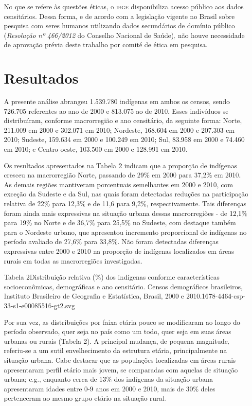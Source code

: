 \documentclass{article}
\begin{document}
No que se refere às questões éticas, o \textsc{ibge} disponibiliza acesso público aos
dados censitários. Dessa forma, e de acordo com a legislação vigente no Brasil
sobre pesquisa com seres humanos utilizando dados secundários de domínio público
(\textit{Resolução nº 466/2012}
do Conselho Nacional de Saúde), não houve necessidade de aprovação prévia deste
trabalho por comité de ética em pesquisa.

\section{Resultados}

A presente análise abrangeu 1.539.780 indígenas em ambos os censos, sendo
726.705 referentes ao ano de 2000 e 813.075 ao de 2010. Esses indivíduos se
distribuíram, conforme macrorregião e ano censitário, da seguinte forma: Norte,
211.009 em 2000 e 302.071 em 2010; Nordeste, 168.604 em 2000 e 207.303 em 2010;
Sudeste, 159.634 em 2000 e 100.249 em 2010; Sul, 83.958 em 2000 e 74.460 em
2010; e Centro-oeste, 103.500 em 2000 e 128.991 em 2010.

Os resultados apresentados na Tabela 2 indicam que a proporção de indígenas
cresceu na macrorregião Norte, passando de 29\% em 2000 para 37,2\% em 2010. As
demais regiões mantiveram porcentuais semelhantes em 2000 e 2010, com exceção da
Sudeste e da Sul, nas quais foram detectadas reduções na participação relativa
de 22\% para 12,3\% e de 11,6 para 9,2\%, respectivamente. Tais diferenças foram
ainda mais expressivas na situação urbana dessas macrorregiões - de 12,1\% para
19\% no Norte e de 36,7\% para 25,5\% no Sudeste, com destaque também para o
Nordeste urbano, que apresentou incremento proporcional de indígenas no período
avaliado de 27,6\% para 33,8\%. Não foram detectadas diferenças expressivas
entre 2000 e 2010 na proporção de indígenas localizados em áreas rurais em todas
as macrorregiões investigadas.

Tabela 2Distribuição relativa (\%) dos indígenas conforme características
socioeconômicas, demográficas e ano censitário. Censos demográficos brasileiros,
Instituto Brasileiro de Geografia e Estatística, Brasil, 2000 e
2010.1678-4464-csp-33-s1-e00085516-gt2.svg

Por sua vez, as distribuições por faixa etária pouco se modificaram ao longo do
período observado, quer seja no país como um todo, quer seja em suas áreas
urbanas ou rurais (Tabela 2). A principal mudança, de pequena magnitude,
referiu-se a um sutil envelhecimento da estrutura etária, principalmente na
situação urbana. Cabe destacar que as populações localizadas em áreas rurais
apresentaram perfil etário mais jovem, se comparadas com aquelas de situação
urbana; e.g., enquanto cerca de 13\% dos indígenas da situação urbana
apresentaram idades entre 0-9 anos em 2000 e 2010, mais de 30\% deles
pertenceram ao mesmo grupo etário na situação rural.
\end{document}
